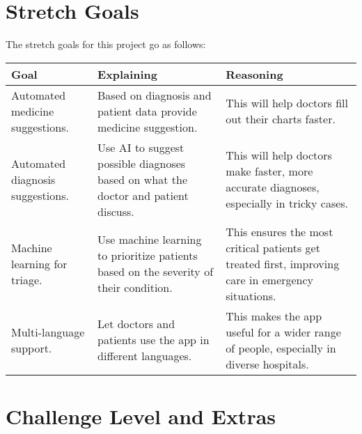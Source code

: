 \documentclass{article}
\begin{document}
\section{Stretch Goals}

The stretch goals for this project go as follows:

\begin{table}[H]
    \centering
    \begin{tabular}{p{4cm} p{4cm} p{4cm}}
        \toprule
        \textbf{Goal} & \textbf{Explaining} & \textbf{Reasoning} \\
        \midrule
        Automated medicine suggestions. & Based on diagnosis and patient data provide medicine suggestion. & This will help doctors fill out their charts faster. \\ %
        \midrule
        Automated diagnosis suggestions.  & Use AI to suggest possible diagnoses based on what the doctor and patient discuss.  & This will help doctors make faster, more accurate diagnoses, especially in tricky cases.\\ 
        \midrule
        Machine learning for triage.  & Use machine learning to prioritize patients based on the severity of their condition. & This ensures the most critical patients get treated first, improving care in emergency situations. \\
        \midrule 
        Multi-language support. & Let doctors and patients use the app in different languages.  & This makes the app useful for a wider range of people, especially in diverse hospitals. \\
        \bottomrule
    \end{tabular}
\end{table}

\section{Challenge Level and Extras}

\end{document}
